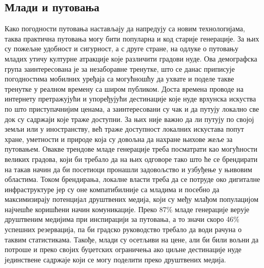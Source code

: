 \documentclass{article}
\begin{document}
\subsection{Млади и путовања}
Како погодности путовања настављају да напредују са новим технологијама, таква практична путовања могу бити популарна и код старије генерације. За њих су пожељне удобност и сигурност, а с друге стране, на одлуке о путовању младих утичу културне атракције које различити градови нуде. Ова демографска група заинтересована је за незаборавне тренутке, што се данас приписује погодностима мобилних уређаја са могућношћу да ухвате и поделе такве тренутке у реалном времену са широм публиком. Доста времена проводе на интернету претражујући и упоређујући дестинације које нуде врхунска искуства по што приступачнијим ценама, а заинтересовани су чак и да путују локално све док су садржаји које траже доступни. За њих није важно да ли путују по својој земљи или у иностранству, већ траже доступност локалних искустава попут хране, уметности и природе која су довољна да нахране њихове жеље за путовањем. Овакве трендове младе генерације треба посматрати као могућности великих градова, који би требало да на њих одговоре тако што ће се брендирати на такав начин да би посетиоци пронашли задовољство и узбуђење у њивовим областима. Током брендирања, локалне власти треба да се потруде око дигиталне инфраструктуре јер су оне компатибилније са младима и посебно да максимизирају потенцијал друштвених медија, који су међу млађом популацијом најчешће коришћени начин комуникације. Преко 87\% младе генерације верује друштвеним медијима при инспирацији за путовања, а то значи скоро 46\% успешних резервација, па би градско руководство требало да води рачуна о таквим статистикама. Такође, млади су осетљиви на цене, али би били вољни да потроше и преко својих буџетских ограничења ако циљне дестинације нуде јединствене садржаје који се могу поделити преко друштвених медија.
\end{document}
